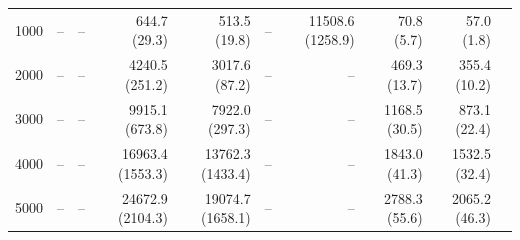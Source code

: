 \begin{table}[htp]
{\begin{tabular}{|r|r|r|r|r|r|r|r|r|r|}
    1000 & --            & --              & 644.7 (29.3)    & 513.5 (19.8)     & --             & 11508.6 (1258.9) & 70.8 (5.7)    & 57.0 (1.8) \\
    2000 & --            & --              & 4240.5 (251.2)  & 3017.6 (87.2)    & --             & --               & 469.3 (13.7)  & 355.4 (10.2)\\
    3000 & --            & --              & 9915.1 (673.8)  & 7922.0 (297.3)   & --             & --               & 1168.5 (30.5) & 873.1 (22.4)\\
    4000 & --            & --              & 16963.4 (1553.3)& 13762.3 (1433.4) & --             & --               & 1843.0 (41.3) & 1532.5 (32.4) \\
    5000 & --            & --              & 24672.9 (2104.3)& 19074.7 (1658.1) & --             & --               & 2788.3 (55.6) & 2065.2 (46.3) \\
    \hline
  \end{tabular}
  }
\end{table}

